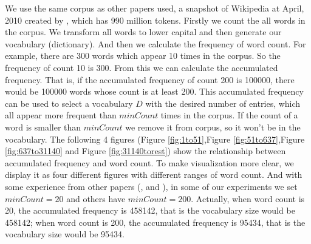 We use the same corpus as other papers used, a snapshot of Wikipedia at April, 2010 created by \cite{Shaoul2010}, which has 990 million tokens. Firstly we count the all words in the corpus. We transform all words to lower capital and then generate our vocabulary (dictionary). And then we calculate the frequency of word count. For example, there are 300 words which appear 10 times in the corpus. So the frequency of count 10 is 300. From this we can calculate the accumulated frequency. That is, if the accumulated frequency of count 200 is 100000, there would be 100000 words whose count is at least 200. This accumulated frequency can be used to select a vocabulary $D$ with the desired number of entries, which all appear more frequent than $minCount$ times in the corpus.  If the count of a word is smaller than $minCount$ we remove it from corpus, so it won't be in the vocabulary.  The following 4 figures (Figure \ref{fig:1to51},Figure \ref{fig:51to637},Figure \ref{fig:637to31140} and Figure \ref{fig:31140torest}) show the relationship between accumulated frequency and word count. To make visualization more clear, we display it as four different figures with different ranges of word count. And with some experience from other papers (\citep{HuangSocherEtAl2012}, \citep{TianDaiEtAl2014} and \citep{NeelakantanShankarEtAl2015}), in some of our experiments we set $minCount=20$ and others have $minCount=200$. Actually, when word count is 20, the accumulated frequency is 458142, that is the vocabulary size would be 458142; when word count is 200, the accumulated frequency is 95434, that is the vocabulary size would be 95434.


